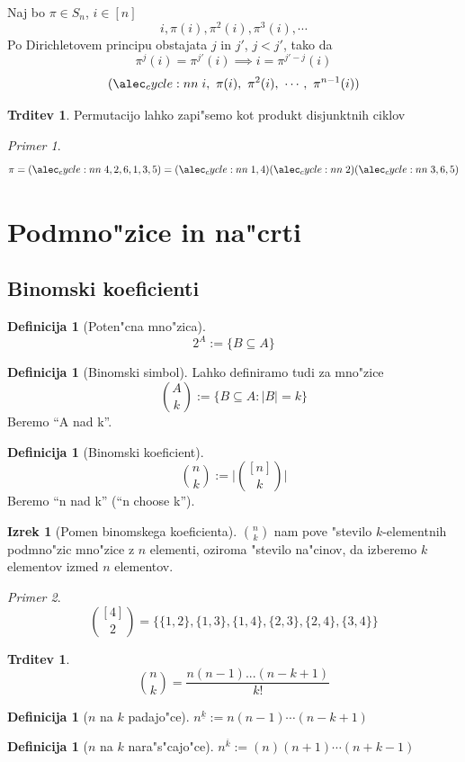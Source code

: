 \documentclass[a4paper,12pt]{article}
\theoremstyle{definition}
\newtheorem{defn}[counter]{Definicija}
\newtheorem{claim}[counter]{Trditev}
\newtheorem{theorem}[counter]{Izrek}
\theoremstyle{remark}
\newtheorem*{ex}{Primer}
\begin{document}
\label{TODO: what is this}
Naj bo $\pi \in S_n$, $i \in [n]$
\[i, \pi (i), \pi^2(i), \pi^3(i), \cdots\]
Po Dirichletovem principu obstajata $j$ in $j'$, $j < j'$, tako da
\[ \pi^j(i) = \pi^{j'}(i) \implies i = \pi^{j'-j}(i) \]
\[\cycle{i,\ \pi(i),\ \pi^2(i),\ \cdots,\ \pi^{n - 1}(i)}\]
\begin{claim}
	Permutacijo lahko zapi"semo kot produkt disjunktnih ciklov
\end{claim}
\begin{ex}
	\[\pi = \cycle{4,2,6,1,3,5} = \cycle{1, 4}\cycle{2}\cycle{3,6,5}\]
\end{ex}

\section{Podmno"zice in na"crti}
\subsection{Binomski koeficienti}
\begin{defn}[Poten"cna mno"zica]
	\[2^A := \{B \subseteq A\}\]
\end{defn}
\begin{defn}[Binomski simbol]
	Lahko definiramo tudi za mno"zice
	\[\binom{A}{k} := \{B \subseteq A: |B| = k\}\]
	Beremo ``A  nad k''.
\end{defn}
\begin{defn}[Binomski koeficient]
	\[\binom{n}{k} := \bigg|\binom{[n]}{k}\bigg|\]
	Beremo ``n nad k'' (``n choose k'').
\end{defn}

\begin{theorem}[Pomen binomskega koeficienta]
	$\binom{n}{k}$ nam pove "stevilo $k$-elementnih podmno"zic mno"zice z $n$ elementi, oziroma "stevilo na"cinov, da izberemo $k$ elementov izmed $n$ elementov.
\end{theorem}
\begin{ex}
	\[\binom{[4]}{2} = \{\{1, 2\}, \{1, 3\}, \{1, 4\}, \{2, 3\}, \{2, 4\}, \{3, 4\}\}\]
\end{ex}

\begin{claim}
	\[\binom{n}{k}=\frac{n(n-1)...(n-k+1)}{k!}\]
\end{claim}
\begin{defn}[$n$ na $k$ padajo"ce]
	$n^{\underline{k}} := n(n-1)\cdots(n-k+1)$\\
\end{defn}
\begin{defn}[$n$ na $k$ nara"s"cajo"ce]
	$n^{\overline{k}} := (n)(n+1)\cdots(n+k-1)$
\end{defn}
\end{document}
